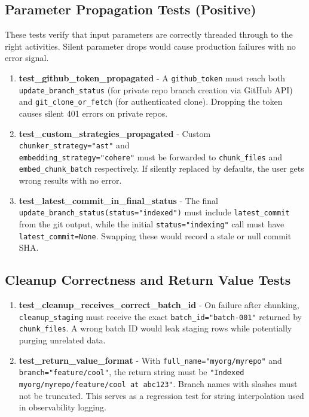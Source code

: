 \documentclass[a4paper,12pt]{article}
\begin{document}
\subsection{Parameter Propagation Tests (Positive)}

These tests verify that input parameters are correctly threaded through to the right activities.
Silent parameter drops would cause production failures with no error signal.

\begin{enumerate}[resume]
  \item \textbf{test\_github\_token\_propagated} -
    A \texttt{github\_token} must reach both \texttt{update\_branch\_status} (for private
    repo branch creation via GitHub API) and \texttt{git\_clone\_or\_fetch} (for
    authenticated clone). Dropping the token causes silent 401 errors on private repos.

  \item \textbf{test\_custom\_strategies\_propagated} -
    Custom \texttt{chunker\_strategy="ast"} and\\ \texttt{embedding\_strategy="cohere"} must
    be forwarded to \texttt{chunk\_files} and \texttt{embed\_chunk\_batch} respectively.
    If silently replaced by defaults, the user gets wrong results with no error.

  \item \textbf{test\_latest\_commit\_in\_final\_status} -
    The final \texttt{update\_branch\_status(status="indexed")} must include
    \texttt{latest\_commit} from the git output, while the initial
    \texttt{status="indexing"} call must have \texttt{latest\_commit=None}.
    Swapping these would record a stale or null commit SHA.
\end{enumerate}

\subsection{Cleanup Correctness and Return Value Tests}

\begin{enumerate}[resume]
  \item \textbf{test\_cleanup\_receives\_correct\_batch\_id} -
    On failure after chunking, \texttt{cleanup\_staging} must receive the exact
    \texttt{batch\_id="batch-001"} returned by \texttt{chunk\_files}. A wrong batch ID
    would leak staging rows while potentially purging unrelated data.

  \item \textbf{test\_return\_value\_format} -
    With \texttt{full\_name="myorg/myrepo"} and \texttt{branch="feature/cool"}, the return
    string must be \texttt{"Indexed myorg/myrepo/feature/cool at abc123"}. Branch names
    with slashes must not be truncated. This serves as a regression test for string
    interpolation used in observability logging.
\end{enumerate}
\end{document}
